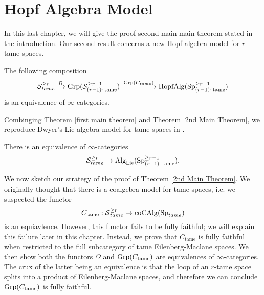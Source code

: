 \chapter{Hopf Algebra Model}

In this last chapter, we will give the proof second main main theorem stated in the introduction.
Our second result concerns a new Hopf algebra model for $r$-tame spaces. 
\begin{theorem}
\label{2nd Main Theorem}
The following composition 
$$
{\mathcal{S}}^{\geq r}_{tame} \xrightarrow{\Omega}
\operatorname{Grp}({\mathcal{S}}^{\geq r-1}_{(r-1)\text{-}\operatorname{\operatorname{tame}}})
\xrightarrow{\operatorname{Grp}(C_{tame})}
\operatorname{HopfAlg}(\operatorname{Sp}^{\geq r-1}_{(r-1)\text{-}\operatorname{\operatorname{tame}}})
$$
is an equivalence of $\infty$-categories.
\end{theorem}
Combinging Theorem \ref{first main theorem} and Theorem \ref{2nd Main Theorem}, we reproduce Dwyer's Lie algebra model for tame spaces in \cite{Dwyer}.
\begin{theorem}
\cite{Dwyer}
	There is an equivalence of $\infty$-categories
	\[
	{\mathcal{S}}^{\geq r}_{tame} 
	\to
	\operatorname{Alg}_{\operatorname{Lie}}(\operatorname{Sp}^{\geq r-1}_{(r-1)\text{-}\operatorname{\operatorname{tame}}}).
	\]
\end{theorem}

We now sketch our strategy of the proof of Theorem \ref{2nd Main Theorem}.
We originally thought that there is a coalgebra model for tame spaces, i.e. we suspected the functor
	$$
	C_{\operatorname{tame}}:\operatorname{\mathcal{S}}^{\geq r}_{tame}\to \operatorname{coCAlg}(\operatorname{Sp}_{tame})
	$$
	is an equiavlence. However, this functor fails to be fully faithful; we will explain this failure later in this chapter.
	Instead, we prove that $C_{\operatorname{tame}}$ is fully faithful when restricted to the full subcategory of tame Eilenberg-Maclane spaces.
We then show both the functors $\Omega$ and $\operatorname{Grp}(C_{\operatorname{tame}})$ are equivalences of $\infty$-categories. 
The crux of the latter being an equivalence is that the loop of an $r$-tame space splits into a product of Eilenberg-Maclane spaces, and therefore we can conclude $\operatorname{Grp}(C_{\operatorname{tame}})$ is fully faithful.


